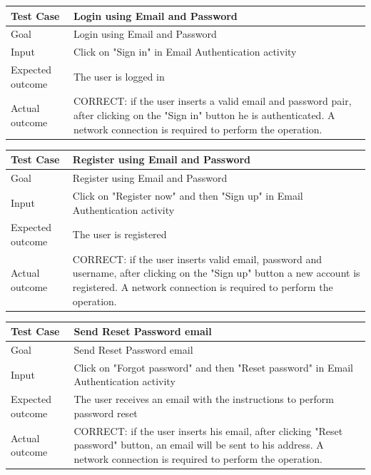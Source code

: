 \documentclass[a4paper]{scrreprt}
\begin{document}
\bigskip
\noindent
\begin{tabularx}{\linewidth}{|l|X|}
	\hline
	\textbf{Test Case} 	& \textbf{Login using Email and Password} \\ \hline
	Goal 				& Login using Email and Password \\ \hline
	Input 				& Click on "Sign in" in Email Authentication activity \\ \hline
	Expected outcome 	& The user is logged in \\ \hline
	Actual outcome 		& CORRECT: if the user inserts a valid email and password pair, after clicking on the "Sign in" button he is authenticated. A network connection is required to perform the operation. \\ \hline
\end{tabularx}
\bigskip
\noindent
\begin{tabularx}{\linewidth}{|l|X|}
	\hline
	\textbf{Test Case} 	& \textbf{Register using Email and Password} \\ \hline
	Goal 				& Register using Email and Password\\ \hline
	Input 				& Click on "Register now" and then "Sign up" in Email Authentication activity \\ \hline
	Expected outcome 	& The user is registered \\ \hline
	Actual outcome 		& CORRECT: if the user inserts valid email, password and username, after clicking on the "Sign up" button a new account is registered. A network connection is required to perform the operation. \\ \hline
\end{tabularx}
\bigskip
\noindent
\begin{tabularx}{\linewidth}{|l|X|}
	\hline
	\textbf{Test Case} 	& \textbf{Send Reset Password email} \\ \hline
	Goal 				& Send Reset Password email \\ \hline
	Input 				& Click on "Forgot password" and then "Reset password" in Email Authentication activity \\ \hline
	Expected outcome 	& The user receives an email with the instructions to perform password reset \\ \hline
	Actual outcome 		& CORRECT: if the user inserts his email, after clicking "Reset password" button, an email will be sent to his address. A network connection is required to perform the operation. \\ \hline
\end{tabularx}
\bigskip
\noindent
\end{document}
